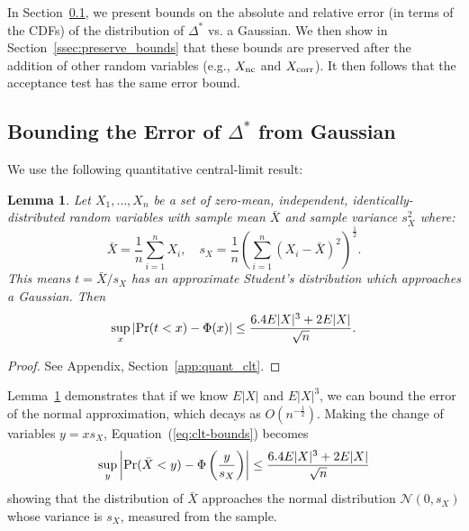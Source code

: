 \documentclass{article}
\newtheorem{lemma}{Lemma}
\begin{document}
In Section~\ref{ssec:delta_star_distribution}, we present bounds on the absolute
and relative error (in terms of the CDFs) of the distribution of $\Delta^*$ vs.
a Gaussian. We then show in Section~\ref{ssec:preserve_bounds} that these bounds
are preserved after the addition of other random variables (e.g., $X_{\rm nc}$
and $X_{\rm corr}$). It then follows that the acceptance test has the same error
bound.

\subsection{Bounding the Error of $\Delta^*$ from Gaussian}\label{ssec:delta_star_distribution}

We use the following quantitative central-limit result:
  
\begin{lemma}\label{lem:quant_clt}
Let $X_1,\ldots,X_n$ be a set of zero-mean, independent, identically-distributed
random variables with sample mean $\bar{X}$ and sample variance $s^2_X$
where:
\begin{equation}
    \bar{X} = \frac{1}{n}\sum_{i=1}^nX_i, \quad s_X = \frac{1}{n}\left(\sum_{i=1}^n(X_i-\bar{X})^2\right)^{\frac{1}{2}}.
\end{equation}
This means $t=\bar{X}/s_X$ has an approximate Student's distribution
which approaches a Gaussian. Then
\begin{equation}\label{eq:clt-bounds}
    \sup_x|{\rm Pr}(t<x) - \Phi(x)| \leq \frac{6.4E|X|^3+2E|X|}{\sqrt{n}}.
\end{equation}
\end{lemma}

\begin{proof}
See Appendix, Section~\ref{app:quant_clt}.
\end{proof}



Lemma~\ref{lem:quant_clt} demonstrates that if we know $E|X|$ and $E|X|^3$, we
can bound the error of the normal approximation, which decays as
$O(n^{-\frac{1}{2}})$. Making the change of variables $y = x s_X$,
Equation~(\ref{eq:clt-bounds}) becomes
\begin{equation}\label{eq:clt-bounds2}
   \sup_y\left|{\rm Pr}(\bar{X}< y) - \Phi\left(\frac{y}{s_X}\right)\right| \leq \frac{6.4E|X|^3+2E|X|}{\sqrt{n}}
\end{equation}
showing that the distribution of $\bar{X}$ approaches the normal distribution
$\mathcal{N}(0,s_X)$ whose variance is $s_X$,
measured from the sample.
\end{document}
